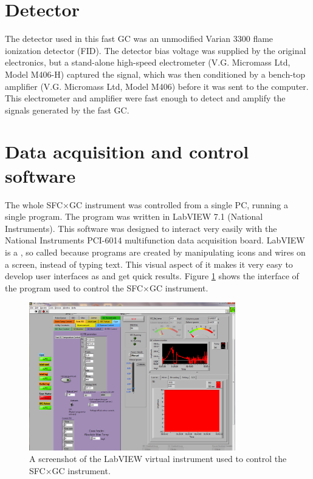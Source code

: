 \section{Detector}

The detector used in this fast GC was an unmodified Varian\texttrademark{} 3300
flame ionization detector (FID). The detector bias voltage was supplied by the
original electronics, but a stand-alone high-speed electrometer (V.G. Micromass
Ltd, Model M406-H) captured the signal, which was then conditioned by a
bench-top amplifier (V.G. Micromass Ltd, Model M406) before it was sent to the
computer. This electrometer and amplifier were fast enough to detect and amplify
the signals generated by the fast GC.

\section{Data acquisition and control software}

The whole SFC×GC instrument was controlled from a single PC, running a single
program. The program was written in LabVIEW 7.1\texttrademark{} (National
Instruments). This software was designed to interact very easily with the
National Instruments PCI-6014 multifunction data acquisition board. LabVIEW is a
, so called because programs are created by
manipulating icons and wires on a screen, instead of typing text. This visual
aspect of it makes it very easy to develop user interfaces as
 and get quick results. Figure \ref{fig:SFCGCFastVI}
shows the interface of the program used to control the SFC×GC instrument.

\begin{figure}
	\centering
	\includegraphics[width=0.8\textwidth]{Figures/Screenshot.png}
	\decoRule
	
	\caption[The main LabVIEW VI]{A screenshot of the LabVIEW virtual instrument
	used to control the SFC×GC instrument.}
	
	\label{fig:SFCGCFastVI}
\end{figure}


